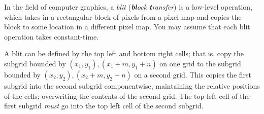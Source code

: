 \documentclass[12pt]{article}
\def\gridpix{
  {2,0},
  {1,3}%
}
\begin{document}

\begin{question}
In the field of computer graphics, a {\em blit} ({\em {\bfseries bl}ock {\bfseries t}ransfer}) is a low-level operation, which takes in a rectangular block of pixels from a pixel map and copies the block to some location in a different pixel map. You may assume that each blit operation takes constant-time. 

A blit can be defined by the top left and bottom right cells; that is, copy the subgrid bounded by \((x_1, y_1), (x_1+m, y_1+n)\) on one grid to the subgrid bounded by \((x_2, y_2), (x_2+m, y_2+n)\) on a second grid. This copies the first subgrid into the second subgrid componentwise, maintaining the relative positions of the cells; overwriting the contents of the second grid. The top left cell of the first subgrid \textit{must} go into the top left cell of the second subgrid. 

\begin{figure}[H]
    \centering
\end{figure}
\end{question}
\end{document}
